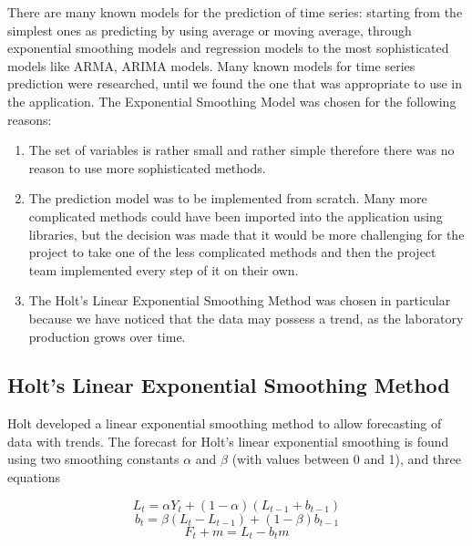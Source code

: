 \documentclass[a4paper,11pt,twoside]{report}
\theoremstyle{definition}
\begin{document}
There are many known models for the prediction of time series: starting from the simplest ones as predicting by using average or moving average, through exponential smoothing models and regression models to the most sophisticated models like ARMA, ARIMA models.
Many known models for time series prediction were researched, until we found the one that was appropriate to use in the application. The Exponential Smoothing Model was chosen for the following reasons:
\begin{enumerate}
\item The set of variables is rather small and rather simple therefore there was no reason to use more sophisticated methods.
\item The prediction model was to be implemented from scratch. Many more complicated methods could have been imported into the application using libraries, but the decision was made that it would be more challenging for the project to take one of the less complicated methods and then the project team implemented every step of it on their own.
\item The Holt's Linear Exponential Smoothing Method was chosen in particular because we have noticed that the data may possess a trend, as the laboratory production grows over time. \cite{K}
\end{enumerate}

\subsection{Holt's Linear Exponential Smoothing Method}

Holt developed a linear exponential smoothing method to allow forecasting of data with trends. The forecast for Holt's linear exponential smoothing is found using two smoothing constants $\alpha$ and $\beta$ (with values between 0 and 1), and three equations

\begin{equation}\label{Holt's Exponential smoothing 1}
L_t = \alpha Y_t + (1 - \alpha) (L_{t-1} + b_{t-1})
\end{equation}
\begin{equation}\label{Holt's Exponential smoothing 2}
b_t = \beta (L_t - L_{t-1}) + (1 - \beta) b_{t-1}
\end{equation}
\begin{equation}\label{Holt's Exponential smoothing 3}
F_t+m = L_t - b_t m
\end{equation}
\end{document}
